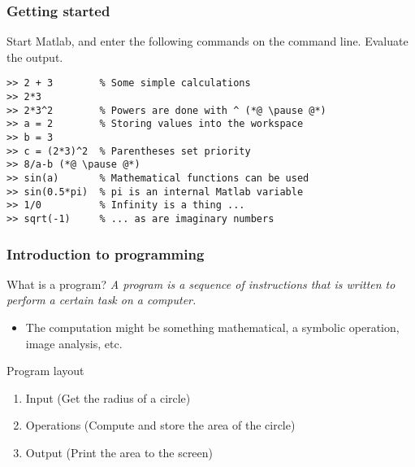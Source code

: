 \begin{frame}[fragile]
 \frametitle{Getting started}
  Start Matlab, and enter the following commands on the command line. Evaluate the output.
  \pause
  \begin{lstlisting}
>> 2 + 3        % Some simple calculations
>> 2*3
>> 2*3^2        % Powers are done with ^ (*@ \pause @*)
>> a = 2        % Storing values into the workspace
>> b = 3
>> c = (2*3)^2  % Parentheses set priority
>> 8/a-b (*@ \pause @*)
>> sin(a)       % Mathematical functions can be used 
>> sin(0.5*pi)  % pi is an internal Matlab variable
>> 1/0          % Infinity is a thing ...
>> sqrt(-1)     % ... as are imaginary numbers
  \end{lstlisting}
\end{frame}

\begin{frame}
 \frametitle{Introduction to programming}
 \begin{block}{What is a program?}
  \emph{A program is a sequence of instructions that is written to perform a certain task on a computer.} %
  \end{block}
  \begin{itemize}
    \item The computation might be something mathematical, a symbolic operation, image analysis, etc.%
  \end{itemize}
  \begin{block}{Program layout}
    \begin{enumerate}
        \item Input (Get the radius of a circle)
        \item Operations (Compute and store the area of the circle)
        \item Output (Print the area to the screen)
    \end{enumerate}
  \end{block}
\end{frame}

